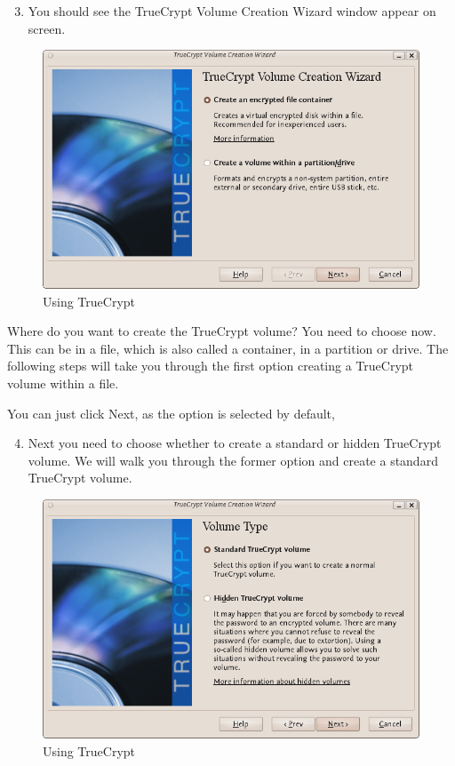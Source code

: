\begin{enumerate}[1.]
\setcounter{enumi}{2}
\item
  You should see the TrueCrypt Volume Creation Wizard window appear on
  screen.
\end{enumerate}
\begin{figure}[htbp]
\centering
\includegraphics{using_tc_002.png}
\caption{Using TrueCrypt}
\end{figure}

Where do you want to create the TrueCrypt volume? You need to choose
now. This can be in a file, which is also called a container, in a
partition or drive. The following steps will take you through the first
option creating a TrueCrypt volume within a file.

You can just click Next, as the option is selected by default,

\begin{enumerate}[1.]
\setcounter{enumi}{3}
\item
  Next you need to choose whether to create a standard or hidden
  TrueCrypt volume. We will walk you through the former option and
  create a standard TrueCrypt volume.
\end{enumerate}
\begin{figure}[htbp]
\centering
\includegraphics{using_tc_003.png}
\caption{Using TrueCrypt}
\end{figure}

